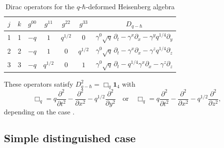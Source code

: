 \documentclass[12pt,a4paper]{article}
\theoremstyle{plain}
\theoremstyle{definition}
\begin{document}
\begin{table}[H]
\centering
\small
\caption{Dirac operators for the $q$-$\hbar$-deformed Heisenberg algebra}
\label{tab:app-dirac-qhbar}
\begin{tabular}{|c|c|c|c|c|c|c|}
\hline
$j$ & $k$ & $g^{00}$ & $g^{11}$ & $g^{22}$ & $g^{33}$ & $D_{q-\hbar}$ \\
\hline
1 & 1 & $-q$ & $1$ & $q^{1/2}$ & $0$ & $\gamma^{0} \sqrt{q} \, \partial_t - \gamma^{x} \partial_x - \gamma^{y} q^{1/4} \partial_y$ \\
\hline
2 & 2 & $-q$ & $1$ & $0$ & $q^{1/2}$ & $\gamma^{0} \sqrt{q} \, \partial_t - \gamma^{x} \partial_x - \gamma^{z} q^{1/4} \partial_z$ \\
\hline
3 & 3 & $-q$ & $q^{1/2}$ & $0$ & $1$ & $\gamma^{0} \sqrt{q} \, \partial_t - q^{1/4} \gamma^{x} \partial_x - \gamma^{z} \partial_z$ \\
\hline
\end{tabular}
\end{table}

These operators satisfy $D_{q-\hbar}^2 = \Box_q \mathbf{1}_4$ with
\[
\Box_q = q \frac{\partial^2}{\partial t^2} - \frac{\partial^2}{\partial x^2} - q^{1/2} \frac{\partial^2}{\partial y^2}
\quad\text{or}\quad
\Box_q = q \frac{\partial^2}{\partial t^2} - \frac{\partial^2}{\partial x^2} - q^{1/2} \frac{\partial^2}{\partial z^2},
\]
depending on the case \cite{Volovich-Arefeva-91}.

\subsection{Simple distinguished case}
\end{document}
